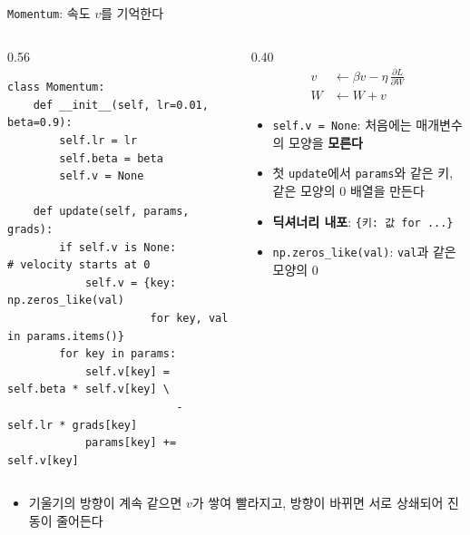 \documentclass[aspectratio=169,11pt]{beamer}
\newcommand{\codesmall}{\ttfamily\fontsize{7.4}{8.3}\selectfont}
\newcommand{\pd}[2]{\frac{\partial #1}{\partial #2}}
\newcommand{\code}[1]{\texttt{#1}}
\begin{document}
\begin{frame}[fragile]{\code{Momentum}: 속도 $v$를 기억한다}
\begin{columns}[T,onlytextwidth]
\begin{column}{0.56\textwidth}
\begin{lstlisting}[basicstyle=\codesmall]
class Momentum:
    def __init__(self, lr=0.01, beta=0.9):
        self.lr = lr
        self.beta = beta
        self.v = None

    def update(self, params, grads):
        if self.v is None:          # velocity starts at 0
            self.v = {key: np.zeros_like(val)
                      for key, val in params.items()}
        for key in params:
            self.v[key] = self.beta * self.v[key] \
                          - self.lr * grads[key]
            params[key] += self.v[key]
\end{lstlisting}
\end{column}
\begin{column}{0.40\textwidth}
\footnotesize
\[
\begin{aligned}
v &\leftarrow \beta v - \eta\,\pd{L}{W}\\
W &\leftarrow W + v
\end{aligned}
\]
\begin{itemize}
\item \code{self.v = None}: 처음에는 매개변수의 모양을 \textbf{모른다}
\item 첫 \code{update}에서 \code{params}와 같은 키, 같은 모양의 $0$ 배열을 만든다
\item \textbf{딕셔너리 내포}: \code{\{키: 값 for ...\}}
\item \code{np.zeros\_like(val)}: \code{val}과 같은 모양의 $0$
\end{itemize}
\end{column}
\end{columns}
\small
\begin{itemize}
\item 기울기의 방향이 계속 같으면 $v$가 쌓여 빨라지고, 방향이 바뀌면 서로 상쇄되어 진동이 줄어든다
\end{itemize}
\end{frame}
\end{document}
